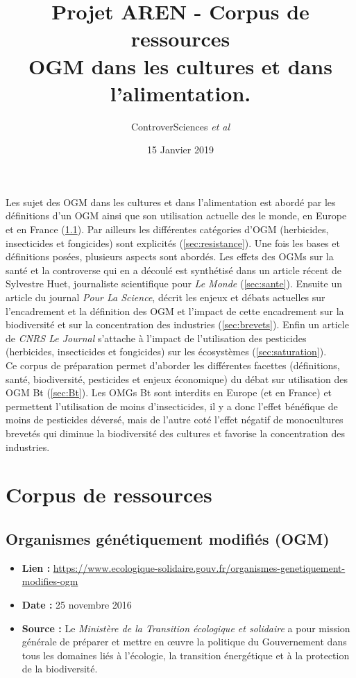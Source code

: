 \documentclass[8pt]{article}
\author{ControverSciences\textit{ et al} }
\title{Projet AREN - Corpus de ressources \\  OGM dans les cultures et dans l'alimentation.}
\date{15 Janvier 2019}
\begin{document}
\maketitle

Les sujet des OGM dans les cultures et dans l'alimentation est abordé par les définitions d'un OGM ainsi que son utilisation actuelle des le monde, en Europe et en France (\ref{sec:definition}). Par ailleurs les différentes catégories d'OGM (herbicides, insecticides et fongicides) sont explicités (\ref{sec:resistance}). Une fois les bases et définitions posées, plusieurs aspects sont abordés.
Les effets des OGMs sur la santé et la controverse qui en a découlé est synthétisé dans un article récent de Sylvestre Huet, journaliste scientifique pour \textit{Le Monde} (\ref{sec:sante}). 
Ensuite un article du journal \textit{Pour La Science}, décrit les enjeux et débats actuelles sur l'encadrement et la définition des OGM et l'impact de cette encadrement sur la biodiversité et sur la concentration des industries (\ref{sec:brevets}). 
Enfin un article de \textit{CNRS Le Journal} s'attache à l'impact de l'utilisation des pesticides (herbicides, insecticides et fongicides) sur les écosystèmes (\ref{sec:saturation}).\\

Ce corpus de préparation permet d'aborder les différentes facettes (définitions, santé, biodiversité, pesticides et enjeux économique) du débat sur utilisation des OGM Bt (\ref{sec:Bt}). Les OMGs Bt sont interdits en Europe (et en France) et permettent l'utilisation de moins d'insecticides, il y a donc l'effet bénéfique de moins de pesticides déversé, mais de l'autre coté l'effet négatif de monocultures brevetés qui diminue la biodiversité des cultures et favorise la concentration des industries.

\tableofcontents
\newpage
\section{Corpus de ressources}
\subsection{Organismes génétiquement modifiés (OGM)}
\label{sec:definition}

\begin{itemize}
	\item \textbf{Lien : }  \url{https://www.ecologique-solidaire.gouv.fr/organismes-genetiquement-modifies-ogm} 
	\item \textbf{Date : }  25 novembre 2016 
	\item \textbf{Source : } Le \textit{Ministère de la Transition écologique et solidaire} a pour mission générale de préparer et mettre en œuvre la politique du Gouvernement dans tous les domaines liés à l’écologie, la transition énergétique et à la protection de la biodiversité.
	
\end{itemize}
\end{document}

